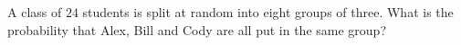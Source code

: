 A class of $24$ students is split at random into eight groups of three. What is the probability that Alex, Bill and Cody are all put in the same group?
